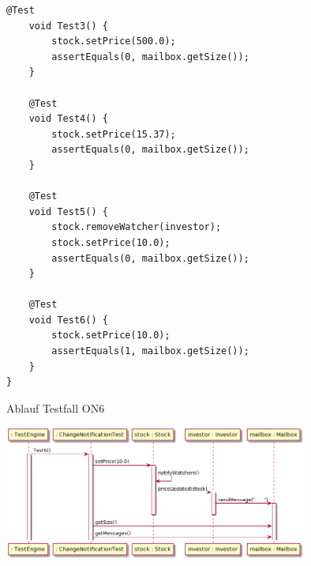 \documentclass{article}
\begin{document}
\begin{enumerate}[label=(\alph*)]
\begin{lstlisting}[style=java, tabsize=2]
	@Test
	void Test3() {
		stock.setPrice(500.0);
		assertEquals(0, mailbox.getSize());
	}

	@Test
	void Test4() {
		stock.setPrice(15.37);
		assertEquals(0, mailbox.getSize());
	}

	@Test
	void Test5() {
		stock.removeWatcher(investor);
		stock.setPrice(10.0);
		assertEquals(0, mailbox.getSize());
	}

	@Test
	void Test6() {
		stock.setPrice(10.0);
		assertEquals(1, mailbox.getSize());
	}
}
		\end{lstlisting}
		Ablauf Testfall ON6
		\begin{center}
			\includegraphics[width=0.75\textwidth]{./Aufgabe8_3}
		\end{center}
	\end{enumerate}
\end{document}
